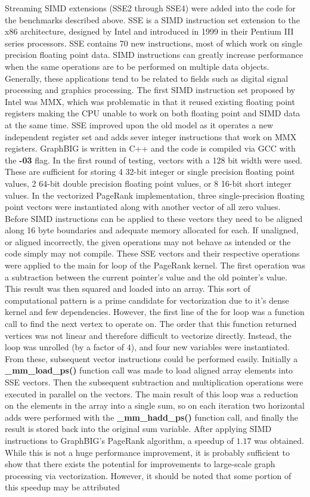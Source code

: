 \documentclass[conference]{IEEEtran}
\begin{document}
Streaming SIMD extensions (SSE2 through SSE4) were added into the code for the benchmarks described above.  SSE is a SIMD instruction set extension to the x86 architecture, designed by Intel and introduced in 1999 in their Pentium III series processors.  SSE contains 70 new instructions, most of which work on single precision floating point data.  SIMD instructions can greatly increase performance when the same operations are to be performed on multiple data objects.  Generally, these applications tend to be related to fields such as digital signal processing and graphics processing.  The first SIMD instruction set proposed by Intel was MMX, which was problematic in that it reused existing floating point registers making the CPU unable to work on both floating point and SIMD data at the same time.  SSE improved upon the old model as it operates a new independent register set and adds sever integer instructions that work on MMX registers.  GraphBIG is written in C++ and the code is compiled via GCC with the \textbf{-03} flag.  In the first round of testing, vectors with a 128 bit width were used.  These are sufficient for storing 4 32-bit integer or single precision floating point values, 2 64-bit double precision floating point values, or 8 16-bit short integer values.  In the vectorized PageRank implementation, three single-precision floating point vectors were instantiated along with another vector of all zero values.  Before SIMD instructions can be applied to these vectors they need to be aligned along 16 byte boundaries and adequate memory allocated for each.  If unaligned, or aligned incorrectly, the given operations may not behave as intended or the code simply may not compile.  These SSE vectors and their respective operations were applied to the main for loop of the PageRank kernel.  The first operation was a subtraction between the current pointer's value and the old pointer's value.  This result was then squared and loaded into an array.  This sort of computational pattern is a prime candidate for vectorization due to it's dense kernel and few dependencies.  However, the first line of the for loop was a function call to find the next vertex to operate on.  The order that this function returned vertices was not linear and therefore difficult to vectorize directly.  Instead, the loop was unrolled (by a factor of $4$), and four new variables were instantiated.  From these, subsequent vector instructions could be performed easily.  Initially a \textbf{\_mm\_load\_ps()} function call was made to load aligned array elements into SSE vectors.  Then the subsequent subtraction and multiplication operations were executed in parallel on the vectors.  The main result of this loop was a reduction on the elements in the array into a single sum, so on each iteration two horizontal adds were performed with the \textbf{\_mm\_hadd\_ps()} function call, and finally the result is stored back into the original sum variable.  After applying SIMD instructions to GraphBIG's PageRank algorithm, a speedup of $1.17$ was obtained.  While this is not a huge performance improvement, it is probably sufficient to show that there exists the potential for improvements to large-scale graph processing via vectorization.  However, it should be noted that some portion of this speedup may be attributed 
\end{document}
